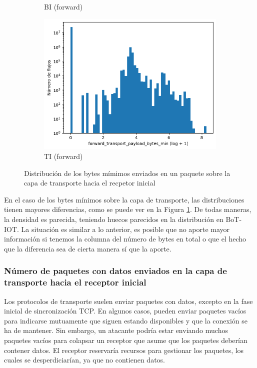 \begin{figure}[H]
\begin{subfigure}[b]{0.32\textwidth}
        \caption{BI (forward)}
    \end{subfigure}
    \hfill
    \begin{subfigure}[b]{0.32\textwidth}
        \centering
        \includegraphics[width=\linewidth]{media/packet_pincer_toniot/forward_transport_payload_bytes_min_log_x_log_y.png}
        \caption{TI (forward)}
    \end{subfigure}
       \caption{Distribución de los bytes mímimos enviados en un paquete sobre la capa de transporte hacia el recpetor inicial}
       \label{fig:packet_pincer_forward_transport_payload_bytes_min}
\end{figure}

En el caso de los bytes mínimos sobre la capa de transporte, las distribuciones tienen mayores diferencias, como se puede ver en la Figura \ref{fig:packet_pincer_forward_transport_payload_bytes_min}. De todas maneras, la densidad es parecida, teniendo huecos parecidos en la distribución en BoT-IOT. La situación es similar a lo anterior, es posible que no aporte mayor información si tenemos la columna del número de bytes en total o que el hecho que la diferencia sea de cierta manera sí que la aporte.

\subsubsection{Número de paquetes con datos enviados en la capa de transporte hacia el receptor inicial}

Los protocolos de transporte suelen enviar paquetes con datos, excepto en la fase inicial de sincronización TCP. En algunos casos, pueden enviar paquetes vacíos para indicarse mutuamente que siguen estando disponibles y que la conexión se ha de mantener. Sin embargo, un atacante podría estar enviando muchos paquetes vacíos para colapsar un receptor que asume que los paquetes deberían contener datos. El receptor reservaría recursos para gestionar los paquetes, los cuales se desperdiciarían, ya que no contienen datos.


